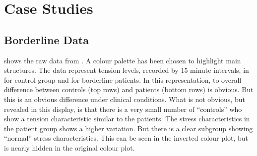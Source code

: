 \documentclass[nogin, dvips,12pt,a4paper,twoside]{amsart}
\begin{document}
\clearpage
{}
\pagebreak
\section{Case Studies}
\label{sec:case}
%
\subsection{Borderline Data}
\label{sec:caseborderline}
\smallskip
{} shows the raw data from \cite{Ebner-Priemer2007Ambulatory-Asse}. A colour palette has been chosen to highlight main structures. The data represent tension levels, recorded by 15 minute intervals, in for control group and for borderline patients. In this representation, to overall difference between controls (top rows) and patients (bottom rows) is obvious. But this is an obvious difference under clinical conditions. What is not obvious, but revealed in this display, is that there is a very small number of ``controls'' who show a tension characteristic similar to the patients. The stress characteristics in the patient group shows a higher variation. But there is a clear subgroup showing ``normal'' stress characteristics. This can be seen in the inverted colour plot, but is nearly hidden in the original colour plot.
\end{document}
